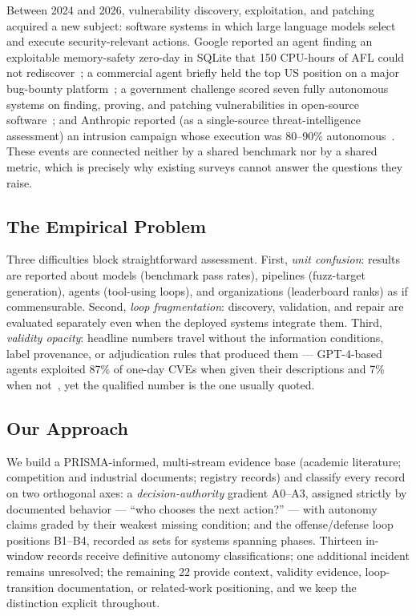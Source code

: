 \documentclass[conference,compsoc]{IEEEtran}
\begin{document}
Between 2024 and 2026, vulnerability discovery, exploitation, and patching acquired a new
subject: software systems in which large language models select and execute security-relevant
actions. Google reported an agent finding an exploitable memory-safety zero-day in SQLite that
150 CPU-hours of AFL could not rediscover~\cite{bigsleep2024}; a commercial agent
briefly held the top US position on a major bug-bounty platform~\cite{xbowtop12025}; a
government challenge scored seven fully autonomous systems on finding, proving, and patching
vulnerabilities in open-source software~\cite{darparesults2025,r7sokaixcc2026}; and Anthropic
reported (as a single-source threat-intelligence assessment) an intrusion campaign whose execution was 80--90\% autonomous~\cite{anthropicgtg2025}.
These events are connected neither by a shared benchmark nor by a shared metric, which is
precisely why existing surveys cannot answer the questions they raise.

\subsection{The Empirical Problem}
Three difficulties block straightforward assessment. First, \emph{unit confusion}: results are
reported about models (benchmark pass rates), pipelines (fuzz-target generation), agents
(tool-using loops), and organizations (leaderboard ranks) as if commensurable. Second,
\emph{loop fragmentation}: discovery, validation, and repair are evaluated separately even when
the deployed systems integrate them. Third, \emph{validity opacity}: headline numbers travel
without the information conditions, label provenance, or adjudication rules that produced them
--- GPT-4-based agents exploited 87\% of one-day CVEs when given their descriptions and 7\%
when not~\cite{fang2024agents}, yet the qualified number is the one usually quoted.

\subsection{Our Approach}
We build a PRISMA-informed, multi-stream evidence base (academic literature; competition and
industrial documents; registry records) and classify every record on two orthogonal axes:
a \emph{decision-authority} gradient A0--A3, assigned strictly by documented behavior ---
``who chooses the next action?'' --- with autonomy claims graded by their weakest missing
condition; and the offense/defense loop positions B1--B4, recorded as sets for systems spanning
phases. Thirteen in-window records receive definitive autonomy classifications; one additional
incident remains unresolved; the remaining 22 provide
context, validity evidence, loop-transition documentation, or related-work positioning, and we
keep the distinction explicit throughout.
\end{document}
